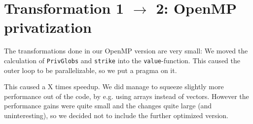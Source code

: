 \section{Transformation 1 $\rightarrow$ 2: OpenMP privatization}

The transformations done in our OpenMP version are very small: We
moved the calculation of \texttt{PrivGlobs} and \texttt{strike} into
the \texttt{value}-function. This caused the outer loop to be
parallelizable, so we put a pragma on it.

This caused a X times speedup. We did manage to squeeze slightly more
performance out of the code, by e.g. using arrays instead of
vectors. However the performance gains were quite small and the
changes quite large (and uninteresting), so we decided not to include
the further optimized version.
